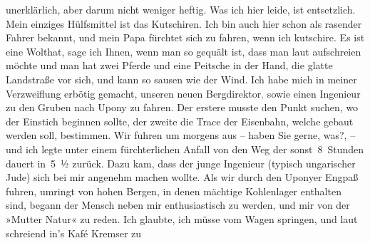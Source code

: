                unerklärlich, aber darum nicht weniger heftig. Was ich hier leide, ist entsetzlich. Mein einziges
               Hülfsmittel ist das Kutschiren. Ich bin auch hier schon als rasender Fahrer bekannt,
               und mein Papa fürchtet sich
               zu fahren, wenn ich kutschire. Es ist eine Wolthat, sage ich Ihnen, wenn man so
               gequält ist, dass man laut aufschreien möchte und man hat zwei Pferde und eine
               Peitsche in der Hand, die glatte Landstraße vor sich, und kann so sausen wie der
               Wind. Ich habe mich in meiner Verzweiflung erbötig gemacht, unseren neuen Bergdirektor\textcolor{gray}{,} sowie einen Ingenieur zu den Gruben nach Upony zu
               fahren. Der erstere musste den Punkt suchen, wo der Einstich beginnen sollte, der
               zweite die Trace der Eisenbahn, welche gebaut werden soll, bestimmen. Wir fuhren um  morgens aus – haben Sie gerne, was?,
               – und ich legte unter einem fürchterlichen Anfall von \label{K_L03105-3v}\label{K_L03105-3} den Weg der sonst 8 Stunden dauert in 5 ½{ }zurück. Dazu kam, dass der
               junge Ingenieur (typisch
                  ungarischer Jude) sich bei
               mir angenehm machen wollte. Als wir durch den Uponyer Engpaß fuhren, umringt von hohen Bergen, in denen mächtige
               Kohlenlager enthalten sind, be{\pb}gann der Mensch neben mir
               enthusiastisch zu werden, und mir von der »Mutter Natur« zu reden. Ich glaubte, ich
               müsse vom Wagen springen, und laut schreiend in’s Kafé Kremser zu
